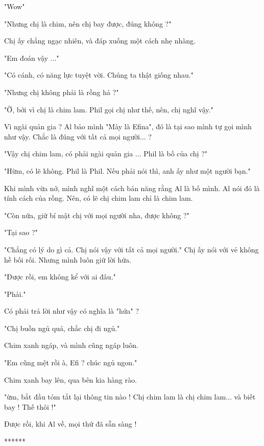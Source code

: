  "Wow"
 
 "Nhưng chị là chim, nên chị bay được, đúng không ?"
 
 Chị ấy chẳng ngạc nhiên, và đáp xuống một cách nhẹ nhàng.
 
 "Em đoán vậy ..."
 
 "Có cánh, có năng lực tuyệt vời. Chúng ta thật giống nhau."
 
 "Nhưng chị không phải là rồng hả ?"
 
 "Ờ, bởi vì chị là chim lam. Phil gọi chị như thế, nên, chị nghĩ vậy."
 
 Vì ngài quản gia ? Al bảo mình "Mày là Efina", đó là tại sao mình tự gọi mình như vậy. Chắc là đúng với tất cả mọi người... ?
 
 "Vậy chị chim lam, có phải ngài quản gia ... Phil là bố của chị ?"
 
 "Hừm, có lẽ không. Phil là Phil. Nếu phải nói thì, anh ấy như một người bạn."
 
 Khi mình vừa nở, mình nghĩ một cách bản năng rằng Al là bố mình. Al nói đó là tính cách của rồng. Nên, có lẽ chị chim lam chỉ là chim lam.
 
 "Còn nữa, giữ bí mật chị với mọi người nha, được không ?"
 
 "Tại sao ?"
 
 "Chẳng có lý do gì cả. Chị nói vậy với tất cả mọi người." Chị ấy nói với vẻ không hề bối rối. Nhưng mình luôn giữ lời hứa.
 
 "Được rồi, em không kể với ai đâu."
 
 "Phải."
 
 Có phải trả lời như vậy có nghĩa là "hứa" ?
 
 "Chị buồn ngủ quá, chắc chị đi ngủ."
 
 Chim xanh ngáp, và mình cũng ngáp luôn.
 
 "Em cũng mệt rồi à, Efi ? chúc ngủ ngon."
 
 Chim xanh bay lên, qua bên kia hàng rào.
 
 "ừm, bắt đầu tóm tắt lại thông tin nào ! Chị chim lam là chị chim lam... và biết bay ! Thế thôi !"
 
 Được rồi, khi Al về, mọi thứ đã sẵn sàng !
 
\begin{center}
	 ******
\end{center}
 

